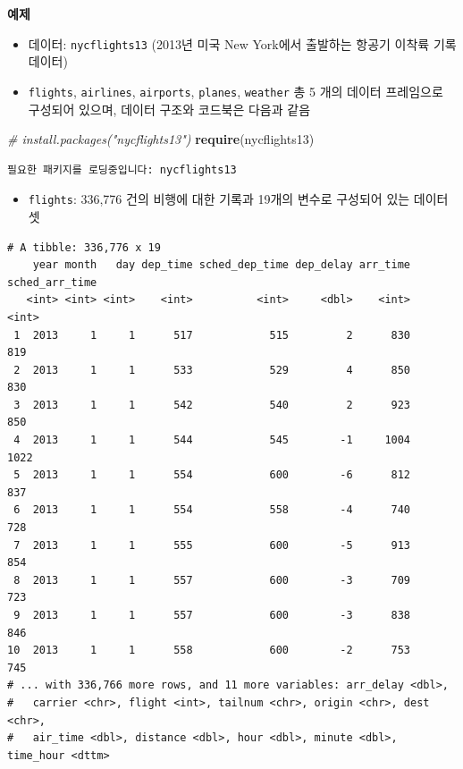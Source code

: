 \documentclass[
  11pt,
]{krantz}
\newenvironment{Shaded}{\begin{snugshade}}{\end{snugshade}}
\newcommand{\CommentTok}[1]{\textcolor[rgb]{0.37,0.37,0.37}{\textit{#1}}}
\newcommand{\KeywordTok}[1]{\textcolor[rgb]{0.27,0.27,0.27}{\textbf{#1}}}
\newcommand{\NormalTok}[1]{#1}
\providecommand{\tightlist}{%
  \setlength{\itemsep}{0pt}\setlength{\parskip}{0pt}}
\begin{document}
\textbf{예제}

\begin{itemize}
\tightlist
\item
  데이터: \texttt{nycflights13} (2013년 미국 New York에서 출발하는 항공기 이착륙 기록 데이터)
\item
  \texttt{flights}, \texttt{airlines}, \texttt{airports}, \texttt{planes}, \texttt{weather} 총 5 개의 데이터 프레임으로 구성되어 있으며, 데이터 구조와 코드북은 다음과 같음
\end{itemize}

\footnotesize

\begin{Shaded}
\begin{Highlighting}[]
\CommentTok{# install.packages("nycflights13")}
\KeywordTok{require}\NormalTok{(nycflights13)}
\end{Highlighting}
\end{Shaded}

\begin{verbatim}
필요한 패키지를 로딩중입니다: nycflights13
\end{verbatim}

\normalsize

\begin{itemize}
\tightlist
\item
  \texttt{flights}: 336,776 건의 비행에 대한 기록과 19개의 변수로 구성되어 있는 데이터셋
\end{itemize}

\footnotesize

\begin{verbatim}
# A tibble: 336,776 x 19
    year month   day dep_time sched_dep_time dep_delay arr_time sched_arr_time
   <int> <int> <int>    <int>          <int>     <dbl>    <int>          <int>
 1  2013     1     1      517            515         2      830            819
 2  2013     1     1      533            529         4      850            830
 3  2013     1     1      542            540         2      923            850
 4  2013     1     1      544            545        -1     1004           1022
 5  2013     1     1      554            600        -6      812            837
 6  2013     1     1      554            558        -4      740            728
 7  2013     1     1      555            600        -5      913            854
 8  2013     1     1      557            600        -3      709            723
 9  2013     1     1      557            600        -3      838            846
10  2013     1     1      558            600        -2      753            745
# ... with 336,766 more rows, and 11 more variables: arr_delay <dbl>,
#   carrier <chr>, flight <int>, tailnum <chr>, origin <chr>, dest <chr>,
#   air_time <dbl>, distance <dbl>, hour <dbl>, minute <dbl>, time_hour <dttm>
\end{verbatim}
\end{document}
